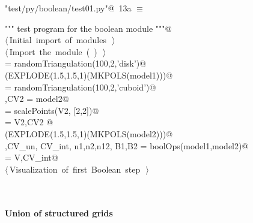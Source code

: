 \documentclass[11pt,oneside]{article}	%
\begin{document}
\begin{flushleft} \small
\begin{minipage}{\linewidth} \label{scrap20}
\protect{}\verb@"test/py/boolean/test01.py"@\nobreak\ {\footnotesize 13a }$\equiv$
\vspace{-1ex}
\begin{list}{}{} \item
\mbox{}\verb@""" test program for the boolean module """@\\
\mbox{}\verb@@\hbox{$\langle\,$Initial import of modules\nobreak\ {\footnotesize {}}$\,\rangle$}\verb@@\\
\mbox{}\verb@@\hbox{$\langle\,$Import the module\nobreak\ ({\footnotesize {}\label{scrap21}
 }\mbox{}\verb@boolean@ ) {\footnotesize {}}$\,\rangle$}\verb@@\\
\mbox{} = randomTriangulation(100,2,'disk')@\\
\mbox{}\verb@VIEW(EXPLODE(1.5,1.5,1)(MKPOLS(model1)))@\\
\mbox{} = randomTriangulation(100,2,'cuboid')@\\
\mbox{},CV2 = model2@\\
\mbox{} = scalePoints(V2, [2,2])@\\
\mbox{} = V2,CV2 @\\
\mbox{}\verb@VIEW(EXPLODE(1.5,1.5,1)(MKPOLS(model2)))@\\
\mbox{}\verb@V,CV_un, CV_int, n1,n2,n12, B1,B2 = boolOps(model1,model2)@\\
\mbox{}\verb@model = V,CV_int@\\
\mbox{}\verb@@\hbox{$\langle\,$Visualization of first Boolean step\nobreak\ {\footnotesize {}}$\,\rangle$}\verb@@\\
\mbox{}\verb@@{\NWsep}
\end{list}
\vspace{-2ex}
\end{minipage}\\[4ex]
\end{flushleft}


\paragraph{Union of structured grids}
\end{document}
